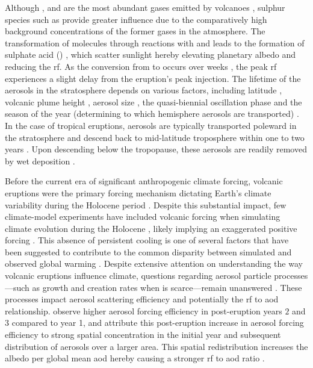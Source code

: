 \documentclass{ametsocV6.1}
\begin{document}
Although ,  and  are the most abundant gases emitted by volcanoes
\citep{robock2000}, sulphur species such as  provide greater influence due to
the comparatively high background concentrations of the former gases in the atmosphere.
The transformation of  molecules through reactions with  and 
leads to the formation of sulphate acid () \citep{robock2000}, which scatter
sunlight hereby elevating planetary albedo and reducing the \gls{rf}. As the conversion
from  to  occurs over weeks \citep{robock2000}, the peak \gls{rf}
experiences a slight delay from the eruption's peak  injection. The lifetime of
the  aerosols in the stratosphere depends on various factors, including
latitude \citep{marshall2019, toohey2019}, volcanic plume height \citep{marshall2019},
aerosol size \citep{marshall2019}, the quasi-biennial oscillation phase
\citep{pitari2016b} and the season of the year (determining to which hemisphere aerosols
are transported) \citep{toohey2011,toohey2019}. In the case of tropical eruptions,
aerosols are typically transported poleward in the stratosphere and descend back to
mid-latitude troposphere within one to two years \citep{robock2000}. Upon descending
below the tropopause, these aerosols are readily removed by wet deposition
\citep{liu2012}.

Before the current era of significant anthropogenic climate forcing, volcanic eruptions
were the primary forcing mechanism dictating Earth's climate variability during the
Holocene period \citep{sigl2022}. Despite this substantial impact, few climate-model
experiments have included volcanic forcing when simulating climate evolution during the
Holocene \citep{sigl2022}, likely implying an exaggerated positive forcing
\citep{gregory2016,solomon2011}. This absence of persistent cooling is one of several
factors that have been suggested to contribute to the common disparity between simulated
and observed global warming \citep{andersson2015}. Despite extensive attention on
understanding the way volcanic eruptions influence climate, questions regarding aerosol
particle processes---such as growth and creation rates when  is scarce---remain
unanswered \citep[e.g.~][]{robock2000,zanchettin2019,marshall2020,marshall2022}. These
processes impact aerosol scattering efficiency and potentially the \gls{rf} to \gls{aod}
relationship. \citet{marshall2020} observe higher aerosol forcing efficiency in
post-eruption years \(2\) and \(3\) compared to year 1, and attribute this post-eruption
increase in aerosol forcing efficiency to strong spatial concentration in the initial
year and subsequent distribution of aerosols over a larger area. This spatial
redistribution increases the albedo per global mean \gls{aod} hereby causing a stronger
\gls{rf} to \gls{aod} ratio \citep{marshall2020}.
\end{document}
